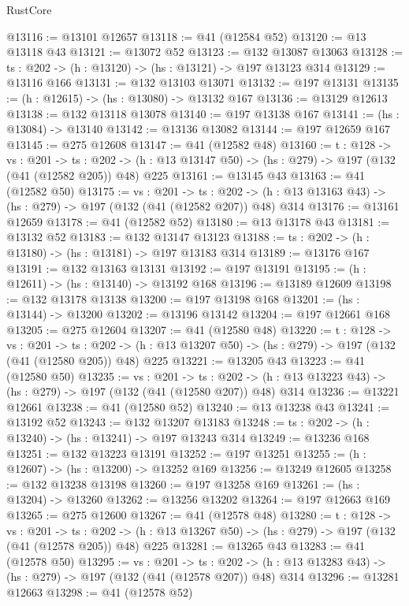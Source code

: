 \begin{lexlean}{RustCore}
\begin{coremodule}
@13116 := @13101 @12657
@13118 := @41 (@12584 @52)
@13120 := @13 @13118 @43
@13121 := @13072 @52
@13123 := @132 @13087 @13063
@13128 := {ts : @202} -> (h : @13120) -> (hs : @13121) -> @197 @13123 @314
@13129 := @13116 @166
@13131 := @132 @13103 @13071
@13132 := @197 @13131
@13135 := (h : @12615) -> (hs : @13080) -> @13132 @167
@13136 := @13129 @12613
@13138 := @132 @13118 @13078
@13140 := @197 @13138 @167
@13141 := (hs : @13084) -> @13140
@13142 := @13136 @13082
@13144 := @197 @12659 @167
@13145 := @275 @12608
@13147 := @41 (@12582 @48)
@13160 := {t : @128} ->
  {vs : @201} ->
  {ts : @202} -> (h : @13 @13147 @50) -> (hs : @279) -> @197 (@132 (@41 (@12582 @205)) @48) @225
@13161 := @13145 @43
@13163 := @41 (@12582 @50)
@13175 := {vs : @201} ->
  {ts : @202} -> (h : @13 @13163 @43) -> (hs : @279) -> @197 (@132 (@41 (@12582 @207)) @48) @314
@13176 := @13161 @12659
@13178 := @41 (@12582 @52)
@13180 := @13 @13178 @43
@13181 := @13132 @52
@13183 := @132 @13147 @13123
@13188 := {ts : @202} -> (h : @13180) -> (hs : @13181) -> @197 @13183 @314
@13189 := @13176 @167
@13191 := @132 @13163 @13131
@13192 := @197 @13191
@13195 := (h : @12611) -> (hs : @13140) -> @13192 @168
@13196 := @13189 @12609
@13198 := @132 @13178 @13138
@13200 := @197 @13198 @168
@13201 := (hs : @13144) -> @13200
@13202 := @13196 @13142
@13204 := @197 @12661 @168
@13205 := @275 @12604
@13207 := @41 (@12580 @48)
@13220 := {t : @128} ->
  {vs : @201} ->
  {ts : @202} -> (h : @13 @13207 @50) -> (hs : @279) -> @197 (@132 (@41 (@12580 @205)) @48) @225
@13221 := @13205 @43
@13223 := @41 (@12580 @50)
@13235 := {vs : @201} ->
  {ts : @202} -> (h : @13 @13223 @43) -> (hs : @279) -> @197 (@132 (@41 (@12580 @207)) @48) @314
@13236 := @13221 @12661
@13238 := @41 (@12580 @52)
@13240 := @13 @13238 @43
@13241 := @13192 @52
@13243 := @132 @13207 @13183
@13248 := {ts : @202} -> (h : @13240) -> (hs : @13241) -> @197 @13243 @314
@13249 := @13236 @168
@13251 := @132 @13223 @13191
@13252 := @197 @13251
@13255 := (h : @12607) -> (hs : @13200) -> @13252 @169
@13256 := @13249 @12605
@13258 := @132 @13238 @13198
@13260 := @197 @13258 @169
@13261 := (hs : @13204) -> @13260
@13262 := @13256 @13202
@13264 := @197 @12663 @169
@13265 := @275 @12600
@13267 := @41 (@12578 @48)
@13280 := {t : @128} ->
  {vs : @201} ->
  {ts : @202} -> (h : @13 @13267 @50) -> (hs : @279) -> @197 (@132 (@41 (@12578 @205)) @48) @225
@13281 := @13265 @43
@13283 := @41 (@12578 @50)
@13295 := {vs : @201} ->
  {ts : @202} -> (h : @13 @13283 @43) -> (hs : @279) -> @197 (@132 (@41 (@12578 @207)) @48) @314
@13296 := @13281 @12663
@13298 := @41 (@12578 @52)

\end{coremodule}
\end{lexlean}
